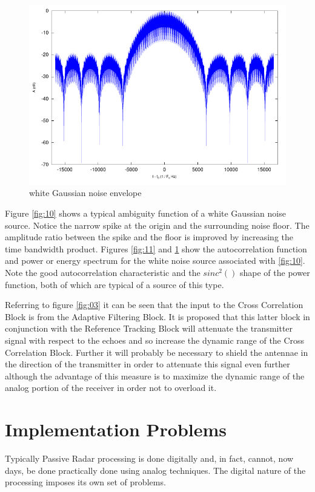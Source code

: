 \documentclass[a4paper]{report}
\numberwithin{equation}{chapter}
\begin{document}
\begin{figure}
\centering 
\includegraphics{Passive-Weather-Radar-Theory-fig-12.pdf}
\caption[white Gaussian noise envelope]{white Gaussian noise envelope}
\label{fig:12}
\end{figure}

\bigskip

Figure \ref{fig:10} shows a typical ambiguity function of a white Gaussian noise source. Notice the narrow spike at the origin and the surrounding noise floor. The amplitude ratio between the spike and the floor is improved by increasing the time bandwidth product. Figures \ref{fig:11} and \ref{fig:12} show the autocorrelation function and power or energy spectrum for the white noise source associated with \ref{fig:10}. Note the good autocorrelation characteristic and the $sinc^2()$ shape of the power function, both of which are typical of a source of this type.

\bigskip

Referring to figure \ref{fig:03} it can be seen that the input to the Cross Correlation Block is from the Adaptive Filtering Block. It is proposed that this latter block in conjunction with the Reference Tracking Block will attenuate the transmitter signal with respect to the echoes and so increase the dynamic range of the Cross Correlation Block. Further it will probably be necessary to shield the antennae in the direction of the transmitter in order to attenuate this signal even further although the advantage of this measure is to maximize the dynamic range of the analog portion of the receiver in order not to overload it.

\section[Implementation Problems]{Implementation Problems}
Typically Passive Radar processing is done digitally and, in fact, cannot, now days, be done practically done using analog techniques. The digital nature of the processing imposes its own set of problems.
\end{document}

